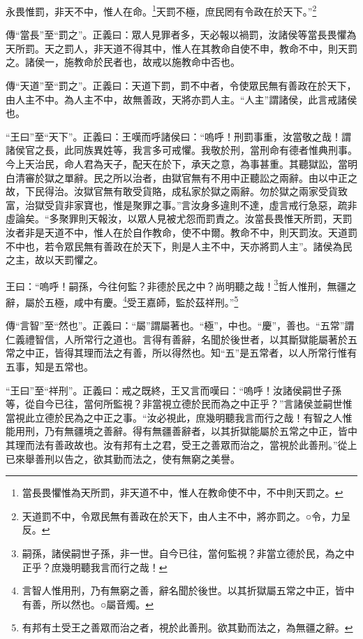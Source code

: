 永畏惟罰，非天不中，惟人在命。\footnote{當長畏懼惟為天所罰，非天道不中，惟人在教命使不中，不中則天罰之。}天罰不極，庶民罔有令政在於天下。”\footnote{天道罰不中，令眾民無有善政在於天下，由人主不中，將亦罰之。○令，力呈反。}

{\noindent\zhuan{}\fzbyks 傳“當長”至“罰之”。正義曰：眾人見罪者多，天必報以禍罰，汝諸侯等當長畏懼為天所罰。天之罰人，非天道不得其中，惟人在其教命自使不申，教命不中，則天罰之。諸侯一，施教命於民者也，故戒以施教命中否也。 \par}

{\noindent\zhuan{}\fzbyks 傳“天道”至“罰之”。正義曰：天道下罰，罰不中者，令使眾民無有善政在於天下，由人主不中。為人主不中，故無善政，天將亦罰人主。“人主”謂諸侯，此言戒諸侯也。 \par}

{\noindent\shu{}\fzkt “王曰”至“天下”。正義曰：王嘆而呼諸侯曰：“嗚呼！刑罰事重，汝當敬之哉！謂諸侯官之長，此同族異姓等，我言多可戒懼。我敬於刑，當刑命有德者惟典刑事。今上天治民，命人君為天子，配天在於下，承天之意，為事甚重。其聽獄訟，當明白清審於獄之單辭。民之所以治者，由獄官無有不用中正聽訟之兩辭。由以中正之故，下民得治。汝獄官無有敢受貨賂，成私家於獄之兩辭。勿於獄之兩家受貨致富，治獄受貨非家寶也，惟是聚罪之事。”言汝身多違則不達，虛言戒行急惡，疏非虛論矣。“多聚罪則天報汝，以眾人見被尤怨而罰責之。汝當長畏惟天所罰，天罰汝者非是天道不中，惟人在於自作教命，使不中爾。教命不中，則天罰汝。天道罰不中也，若令眾民無有善政在於天下，則是人主不中，天亦將罰人主”。諸侯為民之主，故以天罰懼之。 \par}

王曰：“嗚呼！嗣孫，今往何監？非德於民之中？尚明聽之哉！\footnote{嗣孫，諸侯嗣世子孫，非一世。自今已往，當何監視？非當立德於民，為之中正乎？庶幾明聽我言而行之哉！}哲人惟刑，無疆之辭，屬於五極，咸中有慶。\footnote{言智人惟用刑，乃有無窮之善，辭名聞於後世。以其折獄屬五常之中正，皆中有善，所以然也。○屬音燭。}受王嘉師，監於茲祥刑。”\footnote{有邦有土受王之善眾而治之者，視於此善刑。欲其勤而法之，為無疆之辭。}


{\noindent\zhuan{}\fzbyks 傳“言智”至“然也”。正義曰：“屬”謂屬著也。“極”，中也。“慶”，善也。“五常”謂仁義禮智信，人所常行之道也。言得有善辭，名聞於後世者，以其斷獄能屬著於五常之中正，皆得其理而法之有善，所以得然也。知“五”是五常者，以人所常行惟有五事，知是五常也。 \par}

{\noindent\shu{}\fzkt “王曰”至“祥刑”。正義曰：戒之既終，王又言而嘆曰：“嗚呼！汝諸侯嗣世子孫等，從自今已往，當何所監視？非當視立德於民而為之中正乎？”言諸侯並嗣世惟當視此立德於民為之中正之事。“汝必視此，庶幾明聽我言而行之哉！有智之人惟能用刑，乃有無疆境之善辭。得有無疆善辭者，以其折獄能屬於五常之中正，皆中其理而法有善政故也。汝有邦有土之君，受王之善眾而治之，當視於此善刑。”從上已來舉善刑以告之，欲其勤而法之，使有無窮之美譽。 \par}

